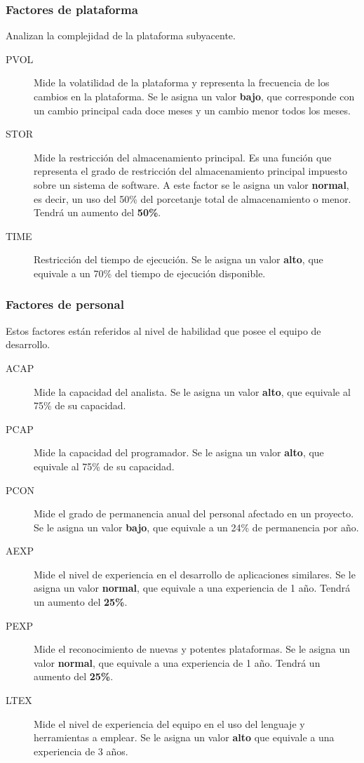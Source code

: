 \documentclass[11pt,a4paper,spanish,twoside]{report}
\begin{document}
\subsubsection{Factores de plataforma}
Analizan la complejidad de la plataforma subyacente.
\begin{description}
\item[PVOL] Mide la volatilidad de la plataforma y representa la frecuencia de
  los cambios en la plataforma. Se le asigna un valor \textbf{bajo}, que
  corresponde con un cambio principal cada doce meses y un cambio menor todos
  los meses.

\item[STOR] Mide la restricción del almacenamiento principal. Es una función
  que representa el grado de restricción del almacenamiento principal
  impuesto sobre un sistema de software. A este factor se le asigna un valor
  \textbf{normal}, es decir, un uso del 50\% del porcetanje total de
  almacenamiento o menor. Tendrá un aumento del \textbf{50\%}.

\item[TIME] Restricción del tiempo de ejecución. Se le asigna un valor
  \textbf{alto}, que equivale a un 70\% del tiempo de ejecución disponible.
\end{description}

\subsubsection{Factores de personal}
Estos factores están referidos al nivel de habilidad que posee el equipo de
desarrollo.
\begin{description}
\item[ACAP] Mide la capacidad del analista. Se le asigna un valor
\textbf{alto}, que equivale al 75\% de su capacidad.
\item[PCAP] Mide la capacidad del programador. Se le asigna un valor
\textbf{alto}, que equivale al 75\% de su capacidad.
\item[PCON] Mide el grado de permanencia anual del personal afectado en un
proyecto. Se le asigna un valor \textbf{bajo}, que equivale a un 24\% de
permanencia por año.
\item[AEXP] Mide el nivel de experiencia en el desarrollo de aplicaciones
similares. Se le asigna un valor \textbf{normal}, que equivale a una
experiencia de 1 año. Tendrá un aumento del \textbf{25\%}.
\item[PEXP] Mide el reconocimiento de nuevas y potentes plataformas. Se le
asigna un valor \textbf{normal}, que equivale a una experiencia de 1
año. Tendrá un aumento del \textbf{25\%}. 
\item[LTEX] Mide el nivel de experiencia del equipo en el uso del lenguaje y
herramientas a emplear. Se le asigna un valor \textbf{alto} que equivale a una
experiencia de 3 años.
\end{description}
\end{document}
